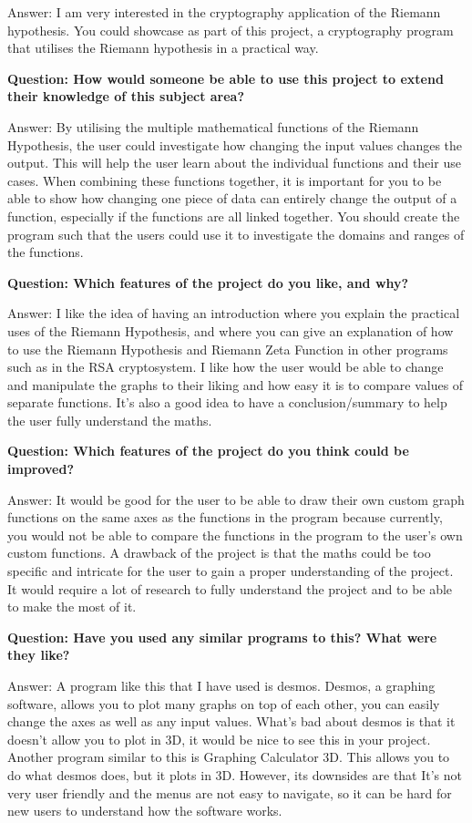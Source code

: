 \documentclass{article}
\begin{document}
Answer: I am very interested in the cryptography application of the Riemann hypothesis. You could showcase as part of this project, a cryptography program that utilises the Riemann hypothesis in a practical way.

\textbf{Question: How would someone be able to use this project to extend their knowledge of this subject area?}

Answer: By utilising the multiple mathematical functions of the Riemann Hypothesis, the user could investigate how changing the input values changes the output. This will help the user learn about the individual functions and their use cases. When combining these functions together, it is important for you to be able to show how changing one piece of data can entirely change the output of a function, especially if the functions are all linked together. You should create the program such that the users could use it to investigate the domains and ranges of the functions.

\textbf{Question: Which features of the project do you like, and why?}

Answer: I like the idea of having an introduction where you explain the practical uses of the Riemann Hypothesis, and where you can give an explanation of how to use the Riemann Hypothesis and Riemann Zeta Function in other programs such as in the RSA cryptosystem. I like how the user would be able to change and manipulate the graphs to their liking and how easy it is to compare values of separate functions. It’s also a good idea to have a  conclusion/summary to help the user fully understand the maths.

\textbf{Question: Which features of the project do you think could be improved?}

Answer: It would be good for the user to be able to draw their own custom graph functions on the same axes as the functions in the program because currently, you would not be able to compare the functions in the program to the user’s own custom functions. A drawback of the project is that the maths could be too specific and intricate for the user to gain a proper understanding of the project. It would require a lot of research to fully understand the project and to be able to make the most of it.

\textbf{Question: Have you used any similar programs to this? What were they like?}

Answer: A program like this that I have used is desmos. Desmos, a graphing software, allows you to plot many graphs on top of each other, you can easily change the axes as well as any input values. What’s bad about desmos is that it doesn’t allow you to plot in 3D, it would be nice to see this in your project. Another program similar to this is Graphing Calculator 3D.
This allows you to do what desmos does, but it plots in 3D. However, its downsides are that It’s not very user friendly and the menus are not easy to navigate, so it can be hard for new users to understand how the software works.
\end{document}
